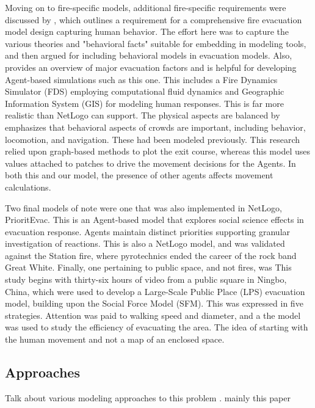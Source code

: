 \documentclass[12pt,letterpaper]{article}
\begin{document}
Moving on to fire-specific models, additional fire-specific requirements were discussed by \cite{kuligowskil}, which outlines a requirement for a comprehensive fire evacuation model design capturing human behavior. The effort here was to capture the various theories and "behavioral facts" suitable for embedding in modeling tools, and then argued for including behavioral models in evacuation models. Also, \cite{abmEvac} provides an overview of major evacuation factors and is helpful for developing Agent-based simulations such as this one. This includes a Fire Dynamics Simulator (FDS) employing computational fluid dynamics and Geographic Information System (GIS) for modeling human responses. This is far more realistic than NetLogo can support. The physical aspects are balanced by \cite{kneidl} emphasizes that behavioral aspects of crowds are  important, including behavior, locomotion, and navigation. These had been modeled previously. This research relied upon graph-based methods to plot the exit course, whereas this model uses values attached to patches to drive the movement decisions for the Agents. In both this and our model, the presence of other agents affects movement calculations.

Two final models of note were one that was also implemented in NetLogo, \cite{prioritEvac} PrioritEvac. This is an Agent-based model that explores social science effects in evacuation response. Agents maintain distinct priorities supporting granular investigation of reactions. This is also a NetLogo model, and was validated against the Station fire, where pyrotechnics ended the career of the rock band Great White.
Finally, one pertaining to public space, and not fires, was \cite{zhouSimulationPedestrianEvacuation2019} This study begins with thirty-six hours of video from a public square in Ningbo, China, which were used to develop a Large-Scale Public Place (LPS) evacuation model, building upon the Social Force Model (SFM). This was expressed in five strategies. Attention was paid to walking speed and diameter, and a the model was used to study the efficiency of evacuating the area. The idea of starting with the human movement and not a map of an enclosed space.

\subsection {Approaches}
Talk about various modeling approaches to this problem   . mainly this paper \cite{almeidaCrowdSimulationModeling2013} 
\end{document}
